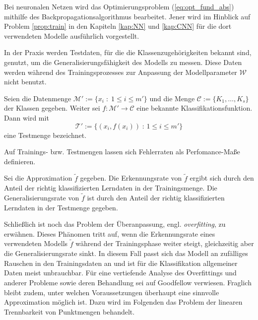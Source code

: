 Bei neuronalen Netzen wird das Optimierungsproblem (\ref{eq:opt_fund_abs}) mithilfe des Backpropagationsalgorithmus bearbeitet. Jener wird im Hinblick auf Problem \ref{prop:train} in den Kapiteln \ref{kap:NN} und \ref{kap:CNN} für die dort verwendeten Modelle ausführlich vorgestellt. 

In der Praxis werden Testdaten, für die die Klassenzugehörigkeiten bekannt sind, genutzt, um die Generalisierungsfähigkeit des Modells zu messen. Diese Daten werden während des Trainingsprozesses zur Anpassung der Modellparameter $\mathcal{W}$ nicht benutzt.

\begin{defi}[Testmenge]
    Seien die Datenmenge $\mathcal{M}':=\{x_i \; : \; 1 \leq i \leq m'\}$ und die Menge $\mathcal{C}:=\{K_1, \ldots, K_s \}$ der Klassen gegeben. Weiter sei $f: \mathcal{M}' \rightarrow \mathcal{C}$ eine bekannte Klassifikationsfunktion. Dann wird mit 
    \begin{equation}
        \label{eq:testset}
        \mathcal{T}':=\{(x_i, f(x_i))\; : \, 1 \leq i \leq m'\}
    \end{equation}
    eine Testmenge bezeichnet.
\end{defi}
Auf Trainings- bzw. Testmengen lassen sich Fehlerraten als Perfomance-Maße definieren.

\begin{defi}
    Sei die Approximation $\tilde{f}$ gegeben.
    Die Erkennungsrate von $\tilde{f}$ ergibt sich durch den Anteil der richtig klassifizierten Lerndaten in der Trainingsmenge. Die Generalisierungsrate von $\tilde{f}$ ist durch den Anteil der richtig klassifizierten Lerndaten in der Testmenge gegeben.
\end{defi}

Schließlich ist noch das Problem der Überanpassung, engl. \textit{overfitting}, zu erwähnen. Dieses Phänomen tritt auf, wenn die Erkennungsrate eines verwendeten Modells $\tilde{f}$ während der Trainingsphase weiter steigt, gleichzeitig aber die Generalisierungsrate sinkt. In diesem Fall passt sich das Modell an zufälliges Rauschen in den Trainingsdaten an und ist für die Klassifikation allgemeiner Daten meist unbrauchbar. Für eine vertiefende Analyse des Overfittings und anderer Probleme sowie deren Behandlung sei auf Goodfellow \cite{Goodfellow-et-al-2016} verwiesen.
Fraglich bleibt zudem, unter welchen Voraussetzungen überhaupt eine sinnvolle Approximation möglich ist. Dazu wird im Folgenden das Problem der linearen Trennbarkeit von Punktmengen behandelt.
